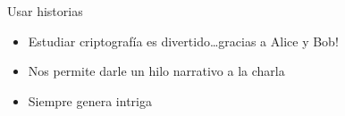 \documentclass{beamer}
\begin{document}
\begin{frame}{Usar historias}
\begin{itemize}
    \item Estudiar criptograf\'ia es divertido\ldots gracias a Alice y Bob!
    \item Nos permite darle un hilo narrativo a la charla
    \item Siempre genera intriga
\end{itemize}

\begin{columns}[onlytextwidth]
    \begin{center}
    \end{center}
    \begin{center}
    \end{center}
\end{columns}
\end{frame}
\end{document}
